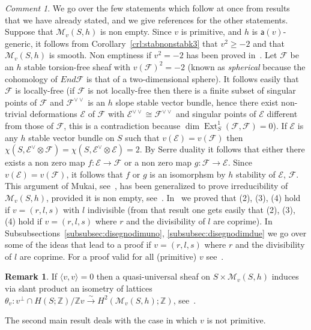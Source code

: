 \documentclass[11pt]{amsart}
\newcommand{\ZZ}{{\mathbb Z}}
\let\mathcal\mathscr
\def\cE{\mathcal{E}}
\def\cF{\mathcal{F}}
\def\cM{\mathcal{M}}
\DeclareMathOperator{\Ext}{Ext}
\newcommand{\la}{\langle}
\newcommand{\ra}{\rangle}
\theoremstyle{definition}
\newtheorem{rmk}[lmm]{Remark}
\theoremstyle{remark}
\newtheorem{cmm}[lmm]{Comment}
\begin{document}
\begin{cmm}\label{cmm:verfica}
%
We go over the few statements which follow at once from results that we have already stated, and we give references for the other statements.  Suppose that  $\cM_v(S,h)$ is non empty.
Since  $v$ is primitive, and $h$ is ${\mathsf a}(v)$-generic, it follows from  Corollary~\ref{crl:stabnonstabk3} that $v^2\ge -2$  and  
that $\cM_v(S,h)$ is smooth. Non emptiness if $v^2= -2$ has been proved in~\cite{kuleshov:fvecc}. Let $\cF$ be an $h$ stable torsion-free sheaf with $v(\cF)^2=-2$ (known as \emph{spherical} because the cohomology of $End\cF$ is that of a two-dimensional sphere). It follows easily that $\cF$ is locally-free (if $\cF$ is not locally-free then there is a finite subset  of singular points of $\cF$ and 
$\cF^{\vee\vee}$ is an $h$ slope stable vector bundle, hence there exist non-trivial deformations $\cE$ of $\cF$ with 
$\cE^{\vee\vee}\cong \cF^{\vee\vee}$ and singular points of $\cE$ different from those of $\cF$, this is a contradiction because $\dim\Ext^1_S(\cF,\cF )=0$). If $\cE$ is any  $h$ stable vector bundle on $S$ such that $v(\cE)=v(\cF)$ then $\chi(S,\cE^{\vee}\otimes\cF)=\chi(S,\cE^{\vee}\otimes\cE)=2$. By Serre duality it follows that either there exists a non zero map  $f\colon\cE\to\cF$ or a non zero map  $g\colon\cF\to\cE$. Since  $v(\cE)=v(\cF)$, it follows that $f$ or $g$ is an isomorphsm by $h$ stability of $\cE$, $\cF$. This argument of Mukai, see~\cite[Cor.~3.5]{mukai:vbtata}, has been generalized 
to prove irreducibility of $\cM_v(S,h)$, provided it is non empty,  see~\cite{kaledin-lehn-sorger:spazimodsing}. 
In~\cite{og:accaduespmod} we proved that (2), (3), (4) hold if $v=(r,l,s)$ with $l$ indivisible (from that result one gets easily that  (2), (3), (4) hold if $v=(r,l,s)$ where $r$ and the divisibility of $l$ are coprime). In Subsubsections~\ref{subsubsec:disegnodimuno}, \ref{subsubsec:disegnodimdue} we go over some of the ideas that lead to a proof  if $v=(r,l,s)$ where $r$ and the divisibility of $l$ are coprime.  For a proof valid for all (primitive) $v$ 
see~\cite[Thm.~8.1]{yoshioka:modfvsupab}.
%
\end{cmm}
%
%
\begin{rmk}
%
If $\la v,v\ra=0$ then a quasi-universal sheaf on $S\times\cM_v(S,h)$  induces via slant product an isometry of  lattices
$\theta_v\colon v^{\bot}\cap H(S;\ZZ)/\ZZ v\xrightarrow{\sim} H^2(\cM_v(S,h);\ZZ)$, see~\cite[Thm.~1.5]{mukai:vbtata}.
%
\end{rmk}
%
The second main result deals with the case in which $v$ is not primitive.
\end{document}
